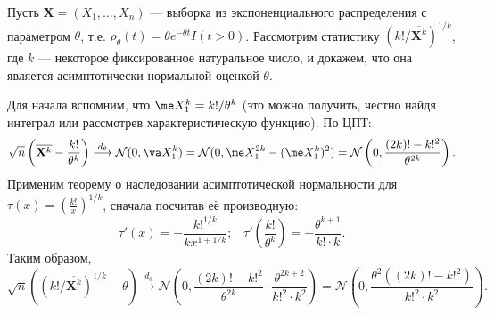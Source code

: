 \begin{example}\label{delta_method_for_exp}
    Пусть $\mathbf X = (X_1, \ldots, X_n)$ --- выборка из экспоненциального распределения с параметром $\theta$, т.е. $\rho_{\theta}(t) = \theta e^{-\theta t}I(t > 0)$. Рассмотрим статистику $\left(k! / \overline{\mathbf X^k}\right)^{1/k}$, где $k$ --- некоторое фиксированное натуральное число, и докажем, что она является асимптотически нормальной оценкой $\theta$.

    Для начала вспомним, что $\me X_1^k = k! / \theta^k$ (это можно получить, честно найдя интеграл или рассмотрев характеристическую функцию). По ЦПТ:
    \[
    \sqrt{n}\left(\overline{\mathbf X^k} - \frac{k!}{\theta^k}\right) \stackrel{d_{\theta}}{\longrightarrow} \mathcal{N}(0, \va X_1^k) = \mathcal{N}(0, \me X_1^{2k} - (\me X_1^k)^2) = \mathcal{N}\left(0, \frac{(2k)!-k!^2}{\theta^{2k}}\right).
    \]
    Применим теорему о наследовании асимптотической нормальности для $\tau(x) = \left(\frac{k!}{x}\right)^{1/k}$, сначала посчитав её производную:
    \[
    \tau'(x) = - \frac{k!^{1/k}}{k x^{1+1/k}};\;\;\;\tau'\left(\frac{k!}{\theta^k}\right) = -\frac{\theta^{k+1}}{k!\cdot k}.
    \]
    Таким образом,
    \[
    \sqrt{n}\left(\left(k! / \overline{\mathbf X^k}\right)^{1/k} - \theta\right) \stackrel{d_{\theta}}{\longrightarrow} \mathcal{N}\left(0, \frac{(2k)!-k!^2}{\theta^{2k}}\cdot \frac{\theta^{2k+2}}{k!^2\cdot k^2} \right) = \mathcal{N}\left(0, \frac{\theta^2((2k)!-k!^2)}{k!^2\cdot k^2} \right).
    \]
\end{example}

